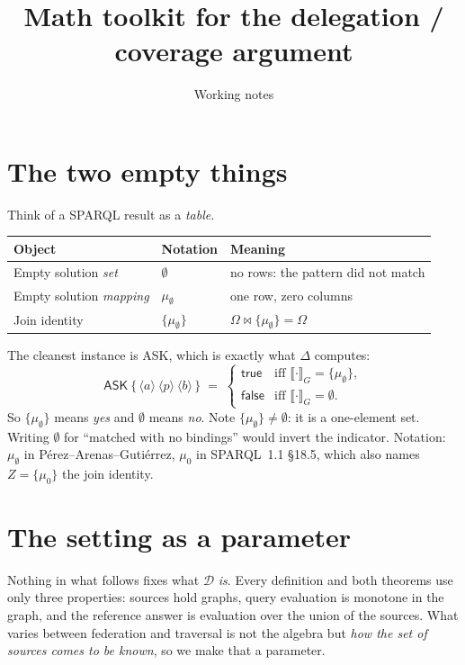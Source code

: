 \documentclass[11pt,a4paper]{article}
\title{Math toolkit for the delegation / coverage argument}
\author{Working notes}
\date{}
\theoremstyle{definition}
\theoremstyle{plain}
\theoremstyle{remark}
\newcommand{\Dd}{\mathcal{D}}
\newcommand{\ev}[2]{\llbracket #1 \rrbracket_{#2}}
\begin{document}
\maketitle
\vspace{-2em}

\section{The two empty things}

Think of a SPARQL result as a \emph{table}.

\begin{center}
\begin{tabular}{lll}
\hline
Object & Notation & Meaning \\
\hline
Empty solution \emph{set}     & $\emptyset$              & no rows: the pattern did not match \\
Empty solution \emph{mapping} & $\mu_\emptyset$          & one row, zero columns \\
Join identity                 & $\{\mu_\emptyset\}$      & $\Omega \bowtie \{\mu_\emptyset\} = \Omega$ \\
\hline
\end{tabular}
\end{center}

\noindent
The cleanest instance is \textsf{ASK}, which is exactly what $\Delta$ computes:
\[
  \textsf{ASK}\ \{\, \langle a\rangle\ \langle p\rangle\ \langle b\rangle \,\}
  \;=\;
  \begin{cases}
    \textsf{true}  & \text{iff } \ev{\cdot}{G} = \{\mu_\emptyset\},\\
    \textsf{false} & \text{iff } \ev{\cdot}{G} = \emptyset.
  \end{cases}
\]
So $\{\mu_\emptyset\}$ means \emph{yes} and $\emptyset$ means \emph{no}. Note
$\{\mu_\emptyset\} \neq \emptyset$: it is a one-element set. Writing $\emptyset$ for
``matched with no bindings'' would invert the indicator. Notation: $\mu_\emptyset$ in
P\'erez--Arenas--Guti\'errez, $\mu_0$ in SPARQL~1.1 \S18.5, which also names
$Z = \{\mu_0\}$ the join identity.

\section{The setting as a parameter}
\label{sec:setting}

Nothing in what follows fixes what $\Dd$ \emph{is}. Every definition and both theorems
use only three properties: sources hold graphs, query evaluation is monotone in the
graph, and the reference answer is evaluation over the union of the sources. What varies
between federation and traversal is not the algebra but \emph{how the set of sources
comes to be known}, so we make that a parameter.
\end{document}
